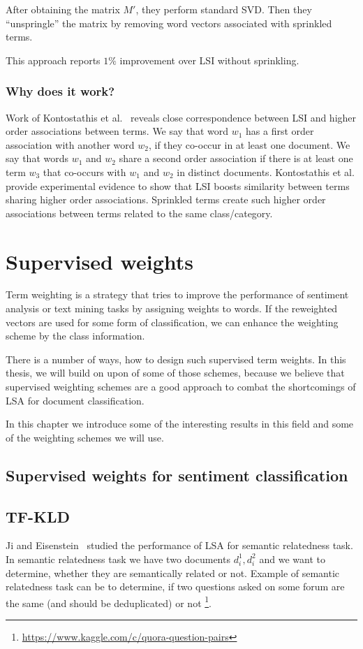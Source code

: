     After obtaining the matrix $M'$, they perform standard SVD. 
    Then they ``unspringle'' the matrix by removing word vectors associated with sprinkled terms.
    
    This approach reports $1\%$ improvement over LSI without sprinkling.
    
    \subsubsection{Why does it work?}
    Work of Kontostathis et al.~\cite{kontostathis2006framework} reveals close correspondence between LSI and higher order associations between terms. 
    We say that word $w_1$ has a first order association with another word $w_2$, if they co-occur in at least one document. 
    We say that words $w_1$ and $w_2$ share a second order association if there is at least one term $w_3$ that co-occurs with $w_1$ and $w_2$ in distinct documents. 
    Kontostathis et al. provide experimental evidence to show that LSI boosts similarity between terms sharing higher order associations. 
    Sprinkled terms create such higher order associations between terms related to  the same class/category.
        
\section{Supervised weights}
    
    Term weighting is a strategy that tries to improve the performance of sentiment analysis or text mining tasks by assigning weights to words.
    If the reweighted vectors are used for some form of classification,
    we can enhance the weighting scheme by the class information.
    
    There is a number of ways, how to design such supervised term weights.
    In this thesis, we will build on upon of some of those schemes,
    because we believe that supervised weighting schemes are a good approach to combat the shortcomings of LSA for document classification.
    
    In this chapter we introduce some of the interesting results in this field and some of the weighting schemes we will use.


    \subsection{Supervised weights for sentiment classification}

    \subsection{TF-KLD}
        Ji and Eisenstein~\cite{ji2013discriminative} %
        studied the performance of LSA for semantic relatedness task.
        In semantic relatedness task we have two documents $d_i^1, d_i^2$ and we want to determine, whether they are semantically related or not. 
        Example of semantic relatedness task can be to determine, if two questions asked on some forum are the same (and should be deduplicated) or not \footnote{\url{https://www.kaggle.com/c/quora-question-pairs}}.
        
